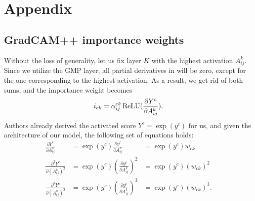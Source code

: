 \renewcommand{\thechapter}{A}
\chapter{Appendix}



\lstset{style=mystyle}

\section*{GradCAM++ importance weights}\label{sec:grad-cam-plus-plus-weight-derivation}

Without the loss of generality, let us fix layer $K$ with the highest activation $A^k_{ij}$.
Since we utilize the GMP layer, all partial derivatives in  will be zero, except for the one corresponding to the highest activation.
As a result, we get rid of both sums, and the importance weight becomes 
\begin{equation}
    i_{ck} = \alpha^{ck}_{ij} \operatorname{ReLU}(\frac{\partial Y^c}{\partial A^k_{ij}}).
\end{equation}
Authors already derived the activated score $Y^c = \exp(y^c)$ for us, and given the architecture of our model, the following set of equations holds:
\begin{equation}
\begin{aligned}
  \frac{\partial Y^c}{\partial A_{ij}^k}       &= \exp(y^c) \frac{\partial y^c}{\partial A_{ij}^k} &= \exp(y^c) w_{ck}     \\
  \frac{\partial^2 Y^c}{\partial (A_{ij}^k)^2} &= \exp(y^c) (\frac{\partial y^c}{\partial A_{ij}^k})^2 &= \exp(y^c) (w_{ck})^2 \\
  \frac{\partial^3 Y^c}{\partial (A_{ij}^k)^3} &= \exp(y^c) (\frac{\partial y^c}{\partial A_{ij}^k})^3 &= \exp(y^c) (w_{ck})^3.
\end{aligned}
\end{equation}

